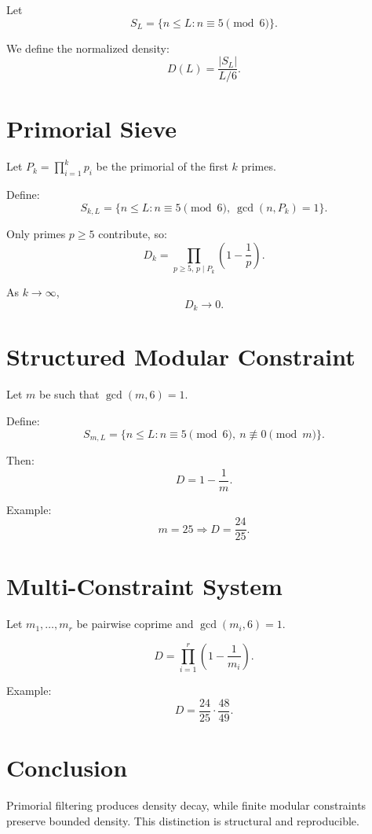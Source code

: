 \documentclass[11pt]{article}
\begin{document}
Let
\[
S_L = \{ n \leq L : n \equiv 5 \pmod{6} \}.
\]

We define the normalized density:
\[
D(L) = \frac{|S_L|}{L/6}.
\]

\section{Primorial Sieve}

Let $P_k = \prod_{i=1}^k p_i$ be the primorial of the first $k$ primes.

Define:
\[
S_{k,L} = \{ n \leq L : n \equiv 5 \pmod{6}, \ \gcd(n, P_k) = 1 \}.
\]

Only primes $p \geq 5$ contribute, so:
\[
D_k = \prod_{p \geq 5,\, p \mid P_k} \left(1 - \frac{1}{p}\right).
\]

As $k \to \infty$,
\[
D_k \to 0.
\]

\section{Structured Modular Constraint}

Let $m$ be such that $\gcd(m,6)=1$.

Define:
\[
S_{m,L} = \{ n \leq L : n \equiv 5 \pmod{6}, \ n \not\equiv 0 \pmod{m} \}.
\]

Then:
\[
D = 1 - \frac{1}{m}.
\]

Example:
\[
m = 25 \Rightarrow D = \frac{24}{25}.
\]

\section{Multi-Constraint System}

Let $m_1, \dots, m_r$ be pairwise coprime and $\gcd(m_i,6)=1$.

\[
D = \prod_{i=1}^r \left(1 - \frac{1}{m_i}\right).
\]

Example:
\[
D = \frac{24}{25} \cdot \frac{48}{49}.
\]

\section{Conclusion}

Primorial filtering produces density decay, while finite modular constraints preserve bounded density. This distinction is structural and reproducible.
\end{document}
